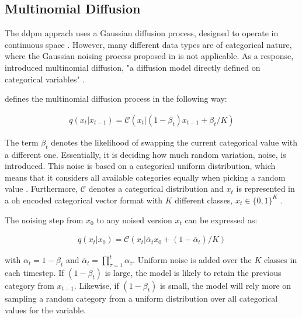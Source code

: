 \subsection{Multinomial Diffusion}
\label{ch:multinomial}
The \gls{ddpm} apprach uses a Gaussian diffusion process, designed to operate in continuous space \cite{kotelnikov2022TabDDPMModellingTabular}.
However, many different data types are of categorical nature, where the Gaussian noising process proposed in  is not applicable.
As a response, \textcite{hoogeboom2021ArgmaxFlowsMultinomial} introduced multinomial diffusion, "a diffusion \gls{model} directly defined on categorical variables" \cite[p, 3]{hoogeboom2021ArgmaxFlowsMultinomial}.

\cite{hoogeboom2021ArgmaxFlowsMultinomial} defines the multinomial diffusion process in the following way:

\begin{equation}
  \begin{align*}
    \label{eqn:mul_diff1}
    q(x_{t}|x_{t-1}) = \mathcal{C}(x_t|(1-\beta_t)x_{t-1}+\beta_t/K)
  \end{align*}
\end{equation}


The term $\beta_t$ denotes the likelihood of swapping the current categorical value with a different one. 
Essentially, it is deciding how much random variation, \ie noise, is introduced.
This noise is based on a categorical uniform distribution, which means that it considers all available categories equally when picking a random value \cite{hoogeboom2021ArgmaxFlowsMultinomial}.
Furthermore, $\mathcal{C}$ denotes a categorical distribution and $x_t$ is represented in a \gls{oh} encoded categorical vector format with $K$ different classes, $x_t\in\{0,1\}^K$ \cite{hoogeboom2021ArgmaxFlowsMultinomial}.

The noising step from $x_0$ to any noised version $x_t$ can be expressed as:

\begin{equation}
  \begin{align*}
    \label{eqn:mul_diff2}
    q(x_{t}|x_{0}) = \mathcal{C}(x_t|\overline{\alpha}_tx_{0}+(1-\overline{\alpha}_t)/K)
  \end{align*}
\end{equation}

with $\alpha_t = 1-\beta_t$ and $\overline{\alpha}_t = \prod_{\tau=1}^{t}\alpha_\tau$.
Uniform noise is added over the $K$ classes in each timestep.
If $(1-\beta_t)$ is large, the \gls{model} is likely to retain the previous category from $x_{t-1}$. 
Likewise, if $(1-\beta_t)$ is small, the \gls{model} will rely more on sampling a random category from a uniform distribution over all categorical values for the variable.

